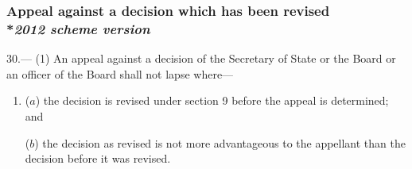 \documentclass[12pt,a4paper]{article}
\begin{document}
\subsubsection[30. Appeal against a decision which has been 
revised --- \emph{2012 scheme version}]{Appeal against a decision which has been 
revised\\*\emph{2012 scheme version}}

30.—%
%
(1) An appeal against a decision of the Secretary of State or the Board or an officer of the Board shall not lapse where—
\begin{enumerate}\item[]
($a$) the decision is revised under section 9 before the appeal is determined; and

($b$) the decision as revised is not more advantageous to the appellant than the decision before it was revised.
\end{enumerate}
\end{document}
